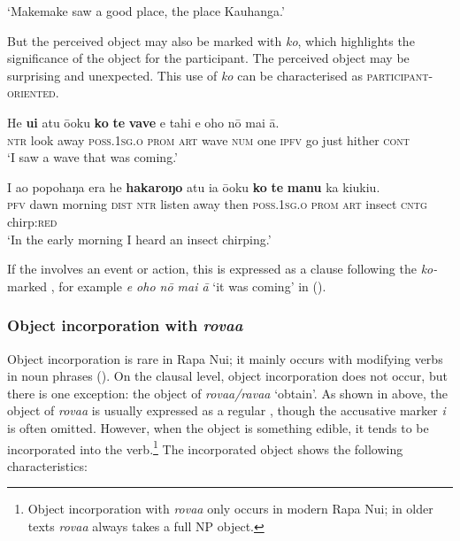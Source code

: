 \glt
‘Makemake saw a good place, the place Kauhanga.’ \textstyleExampleref{[Mtx-1-01.026]}
\z

But the perceived object may also be marked with \textit{ko}, which highlights the significance of the object for the participant. The perceived object may be surprising and unexpected. This use of \textit{ko} can be characterised as \textsc{participant-oriented}.

\ea\label{ex:8.151}
\gll He \textbf{u{\ꞌ}i} atu ō{\ꞌ}oku \textbf{ko} \textbf{te} \textbf{vave} e tahi e oho nō mai {\ꞌ}ā. \\
\textsc{ntr} look away \textsc{poss.1sg.o} \textsc{prom} \textsc{art} wave \textsc{num} one \textsc{ipfv} go just hither \textsc{cont} \\

\glt 
‘I saw a wave that was coming.’ \textstyleExampleref{[R406.040]} 
\z

\ea\label{ex:8.152}
\gll I {\ꞌ}ao popohaŋa era he \textbf{hakaroŋo} atu ia ō{\ꞌ}oku \textbf{ko} \textbf{te} \textbf{manu} ka kiukiu.\\
\textsc{pfv} dawn morning \textsc{dist} \textsc{ntr} listen away then \textsc{poss.1sg.o} \textsc{prom} \textsc{art} insect \textsc{cntg} chirp:\textsc{red}\\

\glt
‘In the early morning I heard an insect chirping.’ \textstyleExampleref{[R109.005]} 
\z

If the  involves an event or action, this is expressed as a clause following the \textit{ko-}marked , for example \textit{e oho nō mai {\ꞌ}ā} ‘it was coming’ in  ().

\subsubsection[Object incorporation with rova{\ꞌ}a]{Object incorporation with \textit{rova{\ꞌ}a}}\label{sec:8.6.4.6}
Object incorporation is rare in Rapa Nui; it mainly occurs with modifying verbs in noun phrases (). On the clausal level, object incorporation does not occur, but there is one exception: the object of \textit{rova{\ꞌ}a/rava{\ꞌ}a} ‘obtain’. As shown in  above, the object of \textit{rova{\ꞌ}a} is usually expressed as a regular , though the accusative marker \textit{i} is often omitted. However, when the object is something edible, it tends to be incorporated into the verb.\footnote{\label{fn:444}Object incorporation with \textit{rova{\ꞌ}a} only occurs in modern Rapa Nui; in older texts \textit{rova{\ꞌ}a} always takes a full NP object.} The incorporated object shows the following characteristics:

